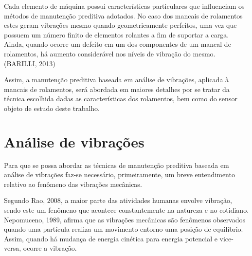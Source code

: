 \documentclass[
	12pt,				
	oneside,			
	a4paper,			
	english,			
	brazil,			
	]{abntex2ppgsi}
\begin{document}
Cada elemento de máquina possui características particulares que influenciam os métodos de manutenção preditiva adotados. No caso dos mancais de rolamentos estes geram vibrações mesmo quando geometricamente perfeitos, uma vez que possuem um número finito de elementos rolantes a fim de suportar a carga. Ainda, quando ocorre um defeito em um dos componentes de um mancal de rolamentos, há aumento considerável nos níveis de vibração do mesmo. (BARILLI, 2013)

Assim, a manutenção preditiva baseada em análise de vibrações, aplicada à mancais de rolamentos, será abordada em maiores detalhes por se tratar da técnica escolhida dadas as características dos rolamentos, bem como do sensor objeto de estudo deste trabalho.

\section{\textbf{Análise de vibrações}}

Para que se possa abordar as técnicas de manutenção preditiva baseada em análise de vibrações faz-se necessário, primeiramente, um breve entendimento relativo ao fenômeno das vibrações mecânicas. 

Segundo Rao, 2008, a maior parte das atividades humanas envolve vibração, sendo este um fenômeno que acontece constantemente na natureza e no cotidiano. Nepomuceno, 1989, afirma que as vibrações mecânicas são fenômenos observados quando uma partícula realiza um movimento entorno uma posição de equilíbrio. Assim, quando há mudança de energia cinética para energia potencial e vice-versa, ocorre a vibração. 



\end{document}
